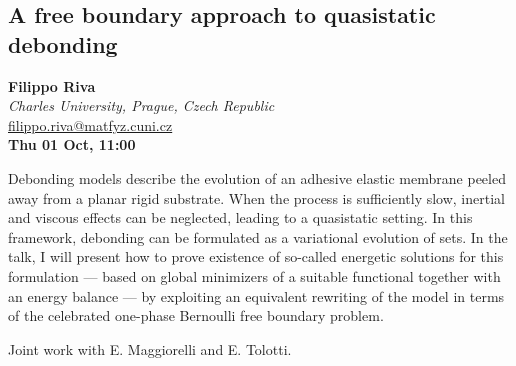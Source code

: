 \documentclass[a4paper,11pt]{article}
\begin{document}
\begin{center}
\subsection*{A free boundary approach to quasistatic debonding}

\textbf{Filippo Riva} \\
\textit{Charles University, Prague, Czech Republic} \\
\url{filippo.riva@matfyz.cuni.cz} \\
\textbf{Thu 01 Oct, 11:00}
\
\end{center}
\medskip
Debonding models describe the evolution of an adhesive elastic membrane peeled away from a planar rigid substrate. When the process is sufficiently slow, inertial and viscous effects can be neglected, leading to a quasistatic setting. In this framework, debonding can be formulated as a variational evolution of sets. In the talk, I will present how to prove existence of so-called energetic solutions for this formulation — based on global minimizers of a suitable functional together with an energy balance — by exploiting an equivalent rewriting of the model in terms of the celebrated one-phase Bernoulli free boundary problem.

\smallskip
Joint work with E. Maggiorelli and E. Tolotti.
\end{document}
